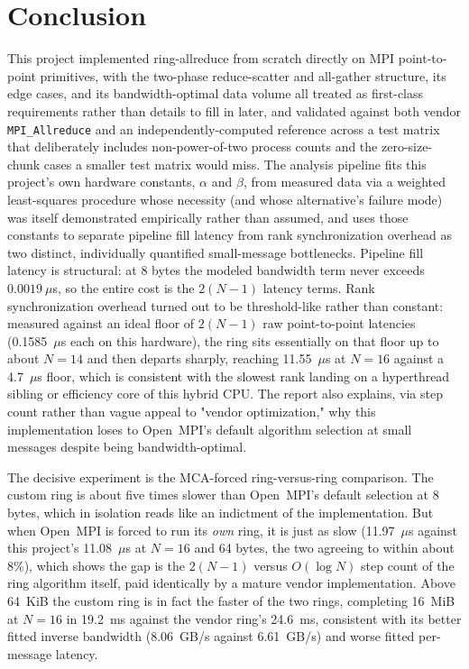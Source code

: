 \section{Conclusion}
\label{sec:conclusion}

This project implemented ring-allreduce from scratch directly on MPI point-to-point primitives, with the two-phase reduce-scatter and all-gather structure, its edge cases, and its bandwidth-optimal data volume all treated as first-class requirements rather than details to fill in later, and validated against both vendor \texttt{MPI\_Allreduce} and an independently-computed reference across a test matrix that deliberately includes non-power-of-two process counts and the zero-size-chunk cases a smaller test matrix would miss. The analysis pipeline fits this project's own hardware constants, $\alpha$ and $\beta$, from measured data via a weighted least-squares procedure whose necessity (and whose alternative's failure mode) was itself demonstrated empirically rather than assumed, and uses those constants to separate pipeline fill latency from rank synchronization overhead as two distinct, individually quantified small-message bottlenecks. Pipeline fill latency is structural: at 8 bytes the modeled bandwidth term never exceeds $0.0019~\mu$s, so the entire cost is the $2(N-1)$ latency terms. Rank synchronization overhead turned out to be threshold-like rather than constant: measured against an ideal floor of $2(N-1)$ raw point-to-point latencies (0.1585~$\mu$s each on this hardware), the ring sits essentially on that floor up to about $N=14$ and then departs sharply, reaching 11.55~$\mu$s at $N=16$ against a 4.7~$\mu$s floor, which is consistent with the slowest rank landing on a hyperthread sibling or efficiency core of this hybrid CPU. The report also explains, via step count rather than vague appeal to "vendor optimization," why this implementation loses to Open~MPI's default algorithm selection at small messages despite being bandwidth-optimal.

The decisive experiment is the MCA-forced ring-versus-ring comparison. The custom ring is about five times slower than Open~MPI's default selection at 8 bytes, which in isolation reads like an indictment of the implementation. But when Open~MPI is forced to run its \emph{own} ring, it is just as slow (11.97~$\mu$s against this project's 11.08~$\mu$s at $N=16$ and 64 bytes, the two agreeing to within about 8\%), which shows the gap is the $2(N-1)$ versus $O(\log N)$ step count of the ring algorithm itself, paid identically by a mature vendor implementation. Above 64~KiB the custom ring is in fact the faster of the two rings, completing 16~MiB at $N=16$ in 19.2~ms against the vendor ring's 24.6~ms, consistent with its better fitted inverse bandwidth (8.06~GB/s against 6.61~GB/s) and worse fitted per-message latency.

